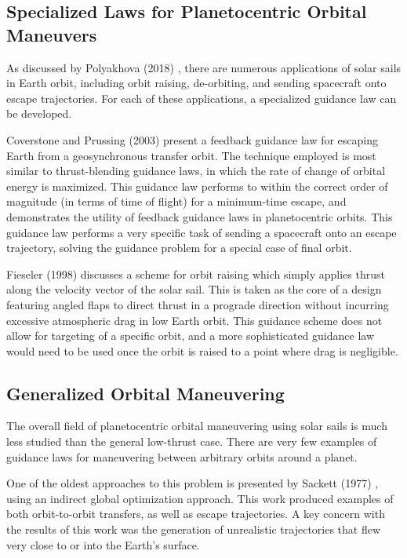\subsection{Specialized Laws for Planetocentric Orbital Maneuvers}
As discussed by Polyakhova (2018) \cite{polyakhova2018solar}, there are numerous applications of solar sails in Earth orbit, including orbit raising, de-orbiting, and sending spacecraft onto escape trajectories. For each of these applications, a specialized guidance law can be developed.

Coverstone and Prussing (2003) \cite{coverstone2003technique} present a feedback guidance law for escaping Earth from a geosynchronous transfer orbit. The technique employed is most similar to thrust-blending guidance laws, in which the rate of change of orbital energy is maximized. This guidance law performs to within the correct order of magnitude (in terms of time of flight) for a minimum-time escape, and demonstrates the utility of feedback guidance laws in planetocentric orbits. This guidance law performs a very specific task of sending a spacecraft onto an escape trajectory, solving the guidance problem for a special case of final orbit.

Fieseler (1998) \cite{fieseler1998method} discusses a scheme for orbit raising which simply applies thrust along the velocity vector of the solar sail. This is taken as the core of a design featuring angled flaps to direct thrust in a prograde direction without incurring excessive atmospheric drag in low Earth orbit. This guidance scheme does not allow for targeting of a specific orbit, and a more sophisticated guidance law would need to be used once the orbit is raised to a point where drag is negligible.

\subsection{Generalized Orbital Maneuvering}
The overall field of planetocentric orbital maneuvering using solar sails is much less studied than the general low-thrust case. There are very few examples of guidance laws for maneuvering between arbitrary orbits around a planet.

One of the oldest approaches to this problem is presented by Sackett (1977) \cite{sackett1977optimal}, using an indirect global optimization approach. This work produced examples of both orbit-to-orbit transfers, as well as escape trajectories. A key concern with the results of this work was the generation of unrealistic trajectories that flew very close to or into the Earth's surface.

